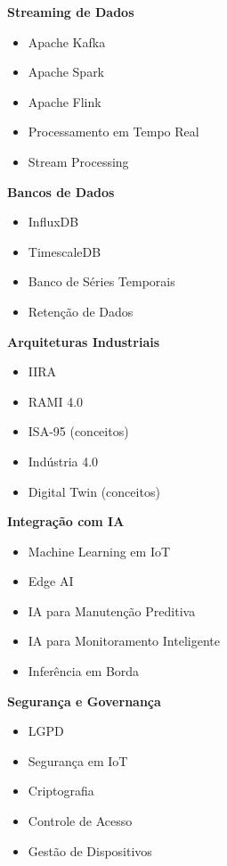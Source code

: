 \textbf{Streaming de Dados}

\begin{itemize}
\item Apache Kafka
\item Apache Spark
\item Apache Flink
\item Processamento em Tempo Real
\item Stream Processing
\end{itemize}

\textbf{Bancos de Dados}

\begin{itemize}
\item InfluxDB
\item TimescaleDB
\item Banco de Séries Temporais
\item Retenção de Dados
\end{itemize}

\textbf{Arquiteturas Industriais}

\begin{itemize}
\item IIRA
\item RAMI 4.0
\item ISA-95 (conceitos)
\item Indústria 4.0
\item Digital Twin (conceitos)
\end{itemize}

\textbf{Integração com IA}

\begin{itemize}
\item Machine Learning em IoT
\item Edge AI
\item IA para Manutenção Preditiva
\item IA para Monitoramento Inteligente
\item Inferência em Borda
\end{itemize}

\textbf{Segurança e Governança}

\begin{itemize}
\item LGPD
\item Segurança em IoT
\item Criptografia
\item Controle de Acesso
\item Gestão de Dispositivos
\end{itemize}

